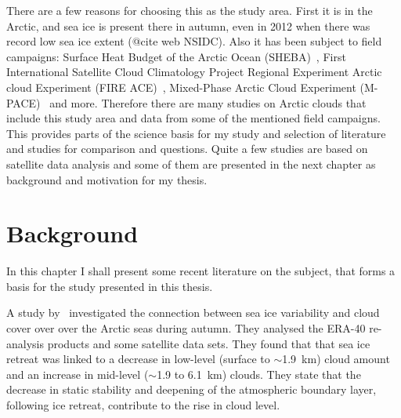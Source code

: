 There are a few reasons for choosing this as the study area. First it is in the Arctic, and sea ice is present there in autumn, even in 2012 when there was record low sea ice extent (@cite web NSIDC). Also it has been subject to field campaigns: Surface Heat Budget of the Arctic Ocean (SHEBA)~\citep{Uttal2002}, First International Satellite Cloud Climatology Project Regional Experiment Arctic cloud Experiment (FIRE ACE)~\citep{Curry2000}, Mixed-Phase Arctic Cloud Experiment (M-PACE)~\citep{Verlinde2007} and more. Therefore there are many studies on Arctic clouds that include this study area and data from some of the mentioned field campaigns. This provides parts of the science basis for my study and selection of literature and studies for comparison and questions. Quite a few studies are based on satellite data analysis and some of them are presented in the next chapter as background and motivation for my thesis.

\section{Background}%
\label{sec:background}
In this chapter I shall present some recent literature on the subject, that forms a basis for the study presented in this thesis.


A study by~\citet{Schweiger2008} investigated the connection between sea ice variability and cloud cover over over the Arctic seas during autumn. They analysed the ERA-40 re-analysis products and some satellite data sets. %
They found that that sea ice retreat was linked to a decrease in low-level (surface to $\sim$1.9~km) cloud amount and an increase in mid-level ($\sim$1.9 to 6.1~km) clouds. They state that the decrease in static stability and deepening of the atmospheric boundary layer, following ice retreat, contribute to the rise in cloud level. 


